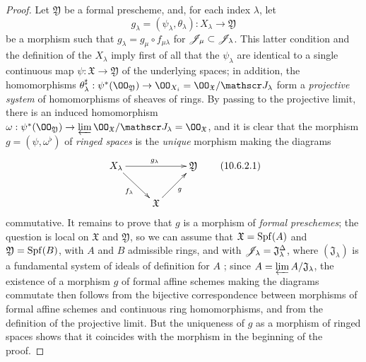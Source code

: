 \begin{proof}
\label{proof-1.10.6.2}
Let $\mathfrak{Y}$ be a formal prescheme, and, for each index $\lambda$, let
\[
  g_\lambda=(\psi_\lambda,\theta_\lambda):X_\lambda\to\mathfrak{Y}
\]
be a morphism such that $g_\lambda=g_\mu\circ f_{\mu\lambda}$ for $\mathscr{J}_\mu\subset\mathscr{J}_\lambda$.
This latter condition and the definition of the $X_\lambda$ imply first of all that the $\psi_\lambda$ are identical to a single continuous map $\psi:\mathfrak{X}\to\mathfrak{Y}$ of the underlying spaces; in addition, the homomorphisms $\theta_\lambda^\sharp:\psi^*(\OO_\mathfrak{Y})\to\OO_{X_i}=\OO_\mathfrak{X}/\sh{J}_\lambda$ form a \emph{projective system} of homomorphisms of sheaves of rings.
By passing to the projective limit, there is an induced homomorphism $\omega:\psi^*(\OO_\mathfrak{Y})\to\varprojlim\OO_\mathfrak{X}/\sh{J}_\lambda=\OO_\mathfrak{X}$, and it is clear that the morphism $g=(\psi,\omega^\flat)$ of \emph{ringed spaces} is the \emph{unique} morphism making the diagrams
\begin{equation*}
\label{1.10.6.2.1}
  \xymatrix{
    X_\lambda\ar[rr]^{g_\lambda}\ar[rd]_{f_\lambda} & &
    \mathfrak{Y}\\
    & \mathfrak{X}\ar[ru]_g
  }
  \tag{10.6.2.1}
\end{equation*}
commutative.
It remains to prove that $g$ is a morphism of \emph{formal preschemes}; the question is local on $\mathfrak{X}$ and $\mathfrak{Y}$, so we can assume that $\mathfrak{X}=\operatorname{Spf}(A)$ and $\mathfrak{Y}=\operatorname{Spf}(B)$, with $A$ and $B$ admissible rings, and with $\mathscr{J}_\lambda=\mathfrak{J}_\lambda^\Delta$, where $(\mathfrak{J}_\lambda)$ is a fundamental system of ideals of definition for $A$ ; since $A=\varprojlim A/\mathfrak{J}_\lambda$, the existence of a morphism $g$ of formal affine schemes making the diagrams  commutate then follows from the bijective correspondence  between morphisms of formal affine schemes and continuous ring homomorphisms, and from the definition of the projective limit.
But the uniqueness of $g$ as a morphism of ringed spaces shows that it coincides with the morphism in the beginning of the proof.
\end{proof}

